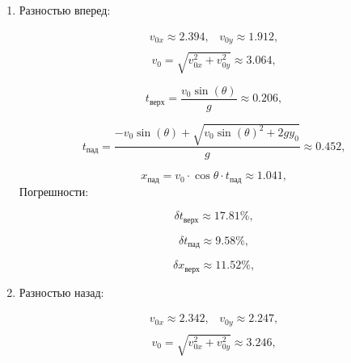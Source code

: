 \documentclass{report}
\begin{document}
\begin{enumerate}
\item Разностью вперед:

\begin{equation}
\begin{aligned}
  v_{0x} \approx 2.394\text{,} \quad
  v_{0y} \approx 1.912\text{,}\\
\end{aligned}
\end{equation}
    \begin{equation}
  v_0 = \sqrt{v_{0x}^2 + v_{0y}^2} \approx 3.064\text{,}
    \end{equation}

\begin{equation}
  t_{\text{верх}} = \dfrac{v_0 \sin(\theta)}{g}\approx 0.206\text{,}
\end{equation}

\begin{equation}
  t_{\text{пад}} = \dfrac{-v_0 \sin(\theta)+\sqrt{v_0 \sin(\theta)^2+2 g y_0}}{g} \approx 0.452\text{,}
\end{equation}

\begin{equation}
  x_{\text{пад}} = v_0\cdot\cos{\theta}\cdot t_{\text{пад}} \approx 1.041 \text{,}
\end{equation}
Погрешности:

\begin{equation}
  \delta t_{\text{верх}} \approx 17.81\% \text{,}
\end{equation}

\begin{equation}
  \delta t_{\text{пад}}  \approx 9.58\% \text{,}
\end{equation}

\begin{equation}
  \delta x_{\text{верх}} \approx 11.52\% \text{,}
\end{equation}

\item Разностью назад:

\begin{equation}
\begin{aligned}
  v_{0x} \approx 2.342\text{,} \quad
  v_{0y} \approx 2.247\text{,}\\
\end{aligned}
\end{equation}
    \begin{equation}
  v_0 = \sqrt{v_{0x}^2 + v_{0y}^2} \approx 3.246\text{,}
    \end{equation}


\end{enumerate}
\end{document}
